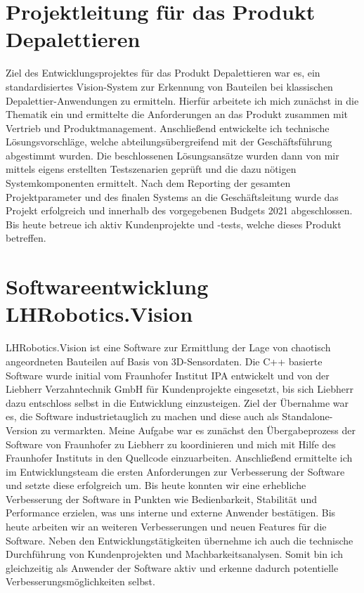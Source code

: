 \documentclass[11pt,a4paper]{moderncv}
\begin{document}
\section{Projektleitung für das Produkt  Depalettieren} 
Ziel des Entwicklungsprojektes für das Produkt Depalettieren war es, ein standardisiertes Vision-System zur Erkennung von Bauteilen bei klassischen Depalettier-Anwendungen zu ermitteln. Hierfür arbeitete ich mich zunächst in die Thematik ein und ermittelte die Anforderungen an das Produkt zusammen mit Vertrieb und Produktmanagement. Anschließend entwickelte ich technische Lösungsvorschläge, welche abteilungsübergreifend mit der Geschäftsführung abgestimmt wurden. Die beschlossenen Lösungsansätze wurden dann von mir mittels eigens erstellten Testszenarien geprüft und die dazu nötigen Systemkomponenten ermittelt. Nach dem Reporting der gesamten Projektparameter und des finalen Systems an die Geschäftsleitung wurde das Projekt erfolgreich und innerhalb des vorgegebenen Budgets 2021 abgeschlossen. Bis heute betreue ich aktiv Kundenprojekte und -tests, welche dieses Produkt betreffen.

\section{Softwareentwicklung LHRobotics.Vision} 
LHRobotics.Vision ist eine Software zur Ermittlung der Lage von chaotisch angeordneten Bauteilen auf Basis von 3D-Sensordaten. Die C++ basierte Software wurde initial vom Fraunhofer Institut IPA entwickelt und von der Liebherr Verzahntechnik GmbH für Kundenprojekte eingesetzt, bis sich Liebherr dazu entschloss selbst in die Entwicklung einzusteigen. Ziel der Übernahme war es, die Software industrietauglich zu machen und diese auch als Standalone-Version zu vermarkten. Meine Aufgabe war es zunächst den Übergabeprozess der Software von Fraunhofer zu Liebherr zu koordinieren und mich mit Hilfe des Fraunhofer Instituts in den Quellcode einzuarbeiten. Anschließend ermittelte ich im Entwicklungsteam die ersten Anforderungen zur Verbesserung der Software und setzte diese erfolgreich um. Bis heute konnten wir eine erhebliche Verbesserung der Software in Punkten wie Bedienbarkeit, Stabilität und Performance erzielen, was uns interne und externe Anwender bestätigen. Bis heute arbeiten wir an weiteren Verbesserungen und neuen Features für die Software. Neben den Entwicklungstätigkeiten übernehme ich auch die technische Durchführung von Kundenprojekten und Machbarkeitsanalysen. Somit bin ich gleichzeitig als Anwender der Software aktiv und erkenne dadurch potentielle Verbesserungsmöglichkeiten selbst.
\end{document}
